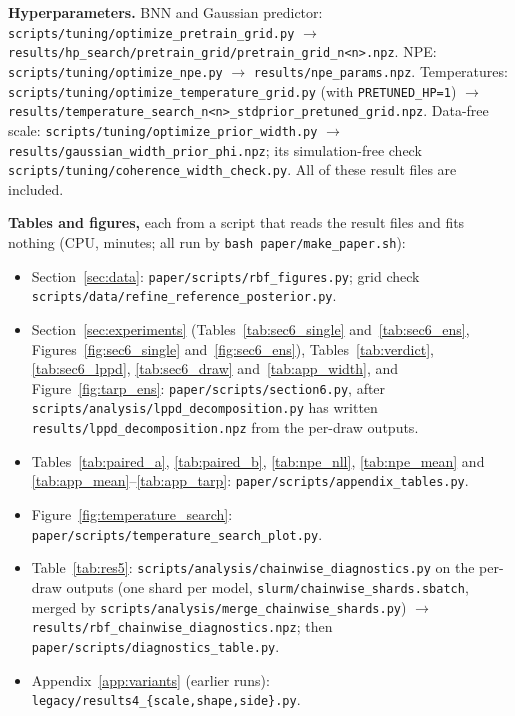 \documentclass[11pt]{article}
\newcommand{\code}[1]{\texttt{#1}}
\begin{document}
\textbf{Hyperparameters.} BNN and Gaussian predictor: \code{scripts/tuning/optimize\_pretrain\_grid.py} $\to$
\code{results/hp\_search/pretrain\_grid/pretrain\_grid\_n<n>.npz}. NPE: \code{scripts/tuning/optimize\_npe.py} $\to$
\code{results/npe\_params.npz}. Temperatures: \code{scripts/tuning/optimize\_temperature\_grid.py} (with
\code{PRETUNED\_HP=1}) $\to$ \code{results/temperature\_search\_n<n>\_stdprior\_pretuned\_grid.npz}. Data-free scale:
\code{scripts/tuning/optimize\_prior\_width.py} $\to$ \code{results/gaussian\_width\_prior\_phi.npz}; its
simulation-free check \code{scripts/tuning/coherence\_width\_check.py}. All of these result files are included.

\textbf{Tables and figures,} each from a script that reads the result files and fits nothing (CPU, minutes; all run by
\code{bash paper/make\_paper.sh}):
\begin{itemize}
\item Section~\ref{sec:data}: \code{paper/scripts/rbf\_figures.py}; grid check \code{scripts/data/refine\_reference\_posterior.py}.
\item Section~\ref{sec:experiments} (Tables~\ref{tab:sec6_single} and~\ref{tab:sec6_ens}, Figures~\ref{fig:sec6_single}
  and~\ref{fig:sec6_ens}), Tables~\ref{tab:verdict}, \ref{tab:sec6_lppd}, \ref{tab:sec6_draw} and~\ref{tab:app_width}, and
  Figure~\ref{fig:tarp_ens}: \code{paper/scripts/section6.py}, after \code{scripts/analysis/lppd\_decomposition.py} has
  written \code{results/lppd\_decomposition.npz} from the per-draw outputs.
\item Tables~\ref{tab:paired_a}, \ref{tab:paired_b}, \ref{tab:npe_nll}, \ref{tab:npe_mean} and
  \ref{tab:app_mean}--\ref{tab:app_tarp}: \code{paper/scripts/appendix\_tables.py}.
\item Figure~\ref{fig:temperature_search}: \code{paper/scripts/temperature\_search\_plot.py}.
\item Table~\ref{tab:res5}: \code{scripts/analysis/chainwise\_diagnostics.py} on the per-draw outputs (one shard per model,
  \code{slurm/chainwise\_shards.sbatch}, merged by \code{scripts/analysis/merge\_chainwise\_shards.py}) $\to$
  \code{results/rbf\_chainwise\_diagnostics.npz}; then \code{paper/scripts/diagnostics\_table.py}.
\item Appendix~\ref{app:variants} (earlier runs): \code{legacy/results4\_\{scale,shape,side\}.py}.
\end{itemize}

\par\endgroup
\end{document}
